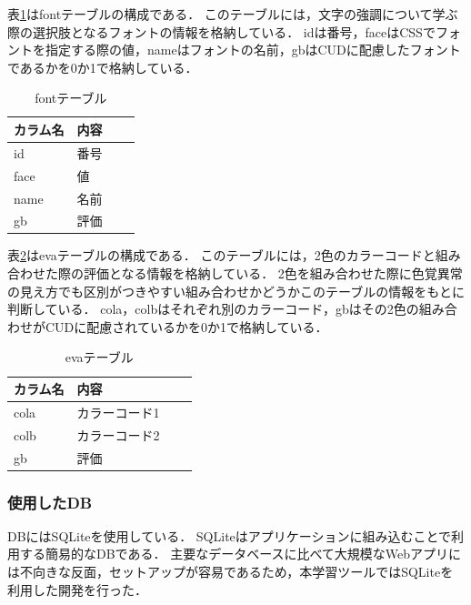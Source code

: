 表\ref{tab:font}はfontテーブルの構成である．
このテーブルには，文字の強調について学ぶ際の選択肢となるフォントの情報を格納している．
idは番号，faceはCSSでフォントを指定する際の値，nameはフォントの名前，gbはCUDに配慮したフォントであるかを0か1で格納している．

\begin{table}[h]
    \caption{fontテーブル}
   \label{tab:font}
    \centering
    \begin{tabular}{|l||l|l|l|}
        \hline
        カラム名 & 内容  \\ \hline
        \hline
        id & 番号 \\ \hline
        face & 値 \\ \hline
        name & 名前 \\ \hline
        gb & 評価 \\ \hline
    \end{tabular}
\end{table}

\clearpage
表\ref{tab:eva}はevaテーブルの構成である．
このテーブルには，2色のカラーコードと組み合わせた際の評価となる情報を格納している．
2色を組み合わせた際に色覚異常の見え方でも区別がつきやすい組み合わせかどうかこのテーブルの情報をもとに判断している．
cola，colbはそれぞれ別のカラーコード，gbはその2色の組み合わせがCUDに配慮されているかを0か1で格納している．

\begin{table}[h]
    \caption{evaテーブル}
   \label{tab:eva}
    \centering
    \begin{tabular}{|l||l|l|l|}
        \hline
        カラム名 & 内容  \\ \hline
        \hline
        cola & カラーコード1 \\ \hline
        colb & カラーコード2 \\ \hline
        gb & 評価 \\ \hline
    \end{tabular}
\end{table}




\subsubsection{使用したDB}
DBにはSQLiteを使用している．
SQLiteはアプリケーションに組み込むことで利用する簡易的なDBである．
主要なデータベースに比べて大規模なWebアプリには不向きな反面，セットアップが容易であるため，本学習ツールではSQLiteを利用した開発を行った．






